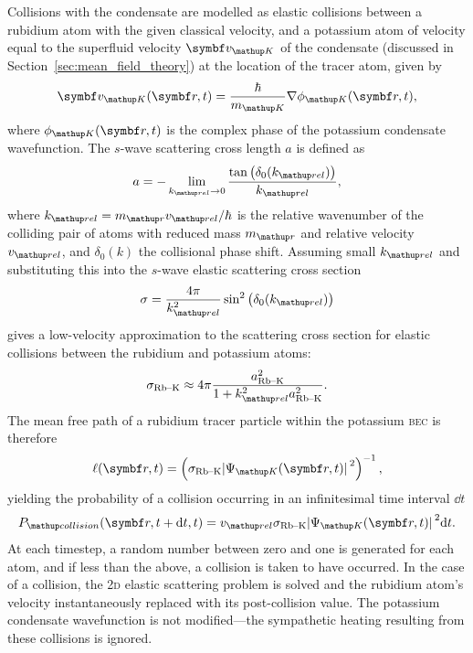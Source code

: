 Collisions with the condensate are modelled as elastic collisions between a rubidium atom with the given classical velocity, and a potassium atom of velocity equal to the superfluid velocity $\vec v_\up{K}$ of the condensate (discussed in Section~\ref{sec:mean_field_theory}) at the location of the tracer atom, given by
\begin{align}
\vec v_\up{K}(\vec r, t) = \frac \hbar {m_\up{K}} \nabla \phi_\up{K}(\vec r, t),
\end{align}
where $\phi_\up{K}(\vec r, t)$ is the complex phase of the potassium condensate wavefunction. The $s$-wave scattering cross length $a$ is defined as~\cite[p 589, eq.~12.101]{bransden_physics_2003}
\begin{align}
a = -\lim_{k_\up{rel}\rightarrow 0} \frac{\tan\left(\delta_0(k_\up{rel})\right)}{k_\up{rel}},
\end{align}
where $k_\up{rel}=m_\up{r}v_\up{rel}/\hbar$ is the relative wavenumber of the colliding pair of atoms with reduced mass $m_\up{r}$ and relative velocity $v_\up{rel}$, and $\delta_0(k)$ the collisional phase shift. Assuming small $k_\up{rel}$ and substituting this into the $s$-wave elastic scattering cross section~\cite[p 584, eq.~12.66]{bransden_physics_2003} 
\begin{align}
\sigma = \frac{4\pi}{k_\up{rel}^2}\sin^2\left(\delta_0(k_\up{rel})\right)
\end{align}
gives a low-velocity approximation to the scattering cross section for elastic collisions between the rubidium and potassium atoms:
\begin{align}
\sigma_{\textrm{Rb--K}} \approx 4\pi\frac{a_{\textrm{Rb--K}}^2}{1 + k_\up{rel}^2a_{\textrm{Rb--K}}^2}.
\end{align}
The mean free path of a rubidium tracer particle within the potassium \textsc{bec} is therefore
\begin{align}
\ell(\vec r, t) = \left(\sigma_{\textrm{Rb--K}}\abs{\Psi_\up{K}(\vec r, t)}^2\right)^{-1},
\end{align}
yielding the probability of a collision occurring in an infinitesimal time interval $\dd t$
\begin{align}
P_\up{collision}(\vec r, t+\dd t, t) = v_\up{rel}\sigma_{\textrm{Rb--K}}\abs{\Psi_\up{K}(\vec r, t)}^2\dd t.
\end{align}
At each timestep, a random number between zero and one is generated for each atom, and if less than the above, a collision is taken to have occurred. In the case of a collision, the \textsc{2d} elastic scattering problem is solved and the rubidium atom's velocity instantaneously replaced with its post-collision value. The potassium condensate wavefunction is not modified---the sympathetic heating resulting from these collisions is ignored.

